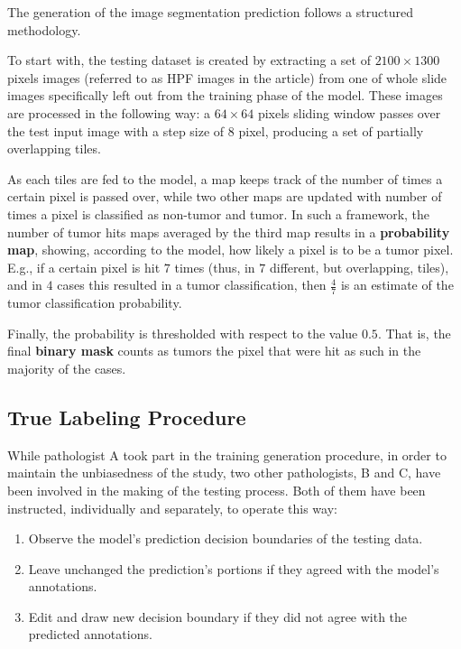 \par
The generation of the image segmentation prediction follows a structured methodology.

\par
To start with, the testing dataset is created by extracting a set of $2100 \times 1300$ pixels images (referred to as HPF images in the article) from one of whole slide images specifically left out from the training phase of the model. These images are processed in the following way: a $64 \times 64$ pixels sliding window passes over the test input image with a step size of $8$ pixel, producing a set of partially overlapping tiles. 

\par
As each tiles are fed to the model, a map keeps track of the number of times a certain pixel is passed over, while two other maps are updated with number of times a pixel is classified as non-tumor and tumor. In such a framework, the number of tumor hits maps averaged by the third map results in a \textbf{probability map}, showing, according to the model, how likely a pixel is to be a tumor pixel. E.g., if a certain pixel is hit $7$ times (thus, in $7$ different, but overlapping, tiles), and in $4$ cases this resulted in a tumor classification, then $\frac{4}{7}$ is an estimate of the tumor classification probability.

\par
Finally, the probability is thresholded with respect to the value $0.5$. That is, the final \textbf{binary mask} counts as tumors the pixel that were hit as such in the majority of the cases.

\subsection{True Labeling Procedure}

\par
While pathologist A took part in the training generation procedure, 
in order to maintain the unbiasedness of the study, two other pathologists, B and C, have been involved in the making of the testing process. Both of them have been instructed, 
individually and separately, to operate this way:

\begin{enumerate}
    \item Observe the model's prediction decision boundaries of the testing data.
    \item Leave unchanged the prediction's portions if they agreed with the model's annotations.
    \item Edit and draw new decision boundary if they did not agree with the predicted annotations.
\end{enumerate}

